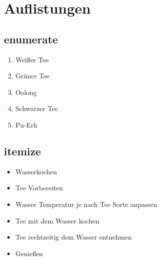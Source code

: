 \section{Auflistungen}

\subsection{enumerate}
\begin{enumerate}
	\item Weißer Tee
	\item Grüner Tee
	\item Oolong
	\item Schwarzer Tee
	\item Pu-Erh
\end{enumerate}

\subsection{itemize}
\begin{itemize}
	\item Wasserkochen
	\item Tee Vorbereiten
	\item Wasser Temperatur je nach Tee Sorte anpassen
	\item Tee mit dem Wasser kochen
	\item Tee rechtzeitig dem Wasser entnehmen
	\item Genießen
\end{itemize}